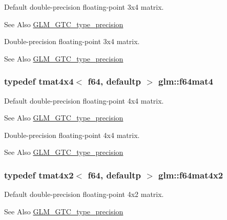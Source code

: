 Default double-\/precision floating-\/point 3x4 matrix. \begin{DoxySeeAlso}{See Also}
\hyperlink{group__gtc__type__precision}{G\-L\-M\-\_\-\-G\-T\-C\-\_\-type\-\_\-precision}
\end{DoxySeeAlso}
Double-\/precision floating-\/point 3x4 matrix. \begin{DoxySeeAlso}{See Also}
\hyperlink{group__gtc__type__precision}{G\-L\-M\-\_\-\-G\-T\-C\-\_\-type\-\_\-precision} 
\end{DoxySeeAlso}
\hypertarget{group__gtc__type__precision_ga5bfcfa195cfe908fe50ecc15abbf7979}{
\subsubsection[{f64mat4}]{\setlength{\rightskip}{0pt plus 5cm}typedef tmat4x4$<$ f64, defaultp $>$ {\bf glm\-::f64mat4}}}\label{group__gtc__type__precision_ga5bfcfa195cfe908fe50ecc15abbf7979}
Default double-\/precision floating-\/point 4x4 matrix. \begin{DoxySeeAlso}{See Also}
\hyperlink{group__gtc__type__precision}{G\-L\-M\-\_\-\-G\-T\-C\-\_\-type\-\_\-precision}
\end{DoxySeeAlso}
Double-\/precision floating-\/point 4x4 matrix. \begin{DoxySeeAlso}{See Also}
\hyperlink{group__gtc__type__precision}{G\-L\-M\-\_\-\-G\-T\-C\-\_\-type\-\_\-precision} 
\end{DoxySeeAlso}
\hypertarget{group__gtc__type__precision_ga13dbaf75e4f1b18c35d2837067a14ce9}{
\subsubsection[{f64mat4x2}]{\setlength{\rightskip}{0pt plus 5cm}typedef tmat4x2$<$ f64, defaultp $>$ {\bf glm\-::f64mat4x2}}}\label{group__gtc__type__precision_ga13dbaf75e4f1b18c35d2837067a14ce9}
Default double-\/precision floating-\/point 4x2 matrix. \begin{DoxySeeAlso}{See Also}
\hyperlink{group__gtc__type__precision}{G\-L\-M\-\_\-\-G\-T\-C\-\_\-type\-\_\-precision}
\end{DoxySeeAlso}
